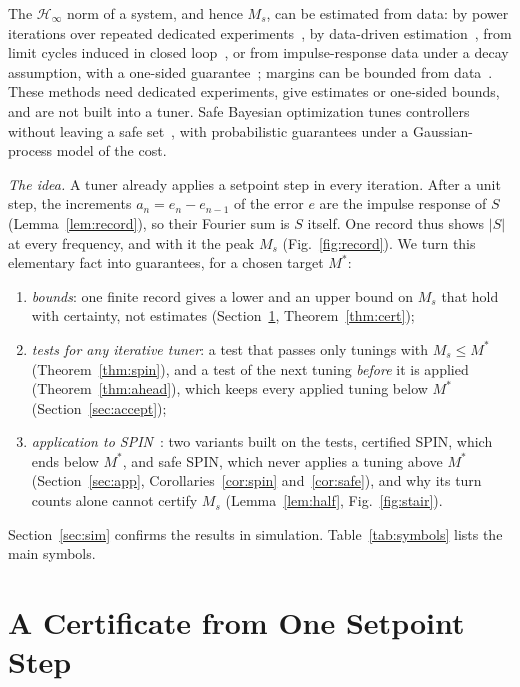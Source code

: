 \documentclass[letterpaper, 10 pt, conference]{ieeeconf}
\newcommand{\spin}{SPIN\xspace}
\begin{document}
The $\mathcal H_\infty$ norm of a system, and hence $M_s$, can be
estimated from data: by power iterations over repeated dedicated
experiments~\cite{Wahlberg2010,Rojas2012}, by data-driven estimation~\cite{vanHeusden2007}, from limit cycles induced in closed loop~\cite{Garcia2003}, or from impulse-response data under a decay
assumption, with a one-sided guarantee~\cite{Tu2017}; margins can be
bounded from data~\cite{Isoshima2023}.
These methods need dedicated experiments, give estimates or one-sided
bounds, and are not built into a tuner. Safe Bayesian optimization tunes
controllers without leaving a safe set~\cite{Berkenkamp2016}, with
probabilistic guarantees under a Gaussian-process model of the cost.

\emph{The idea.} A tuner already applies a setpoint step in every
iteration. After a unit step, the increments $a_n=e_n-e_{n-1}$ of the
error $e$ are the impulse response of $S$ (Lemma~\ref{lem:record}), so
their Fourier sum is $S$ itself. One record thus shows $|S|$ at every
frequency, and with it the peak $M_s$ (Fig.~\ref{fig:record}). We turn
this elementary fact into guarantees, for a chosen target $M^*$:
\begin{enumerate}
\item \emph{bounds}: one finite record gives a lower and an upper bound
on $M_s$ that hold with certainty, not estimates (Section~\ref{sec:cert},
Theorem~\ref{thm:cert});
\item \emph{tests for any iterative tuner}: a test that passes only
tunings with $M_s\le M^*$ (Theorem~\ref{thm:spin}), and a test of
the next tuning \emph{before} it is applied (Theorem~\ref{thm:ahead}),
which keeps every applied tuning below $M^*$ (Section~\ref{sec:accept});
\item \emph{application to \spin}~\cite{SPIN}: two variants built on
the tests, certified \spin, which ends below $M^*$, and safe \spin,
which never applies a tuning above $M^*$ (Section~\ref{sec:app},
Corollaries~\ref{cor:spin} and~\ref{cor:safe}), and why its turn counts
alone cannot certify $M_s$ (Lemma~\ref{lem:half}, Fig.~\ref{fig:stair}).
\end{enumerate}
Section~\ref{sec:sim} confirms the results in simulation.
Table~\ref{tab:symbols} lists the main symbols.

\section{A Certificate from One Setpoint Step}
\label{sec:cert}
\end{document}
